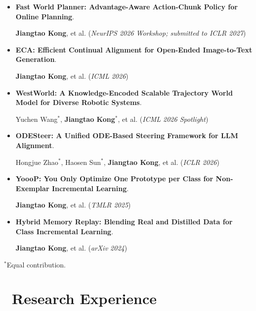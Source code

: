 \documentclass{resume}
\newcommand{\publicationdetails}[1]{%
  {\fontsize{9.5}{11}\selectfont\color{black!72}#1\par}%
}
\begin{document}
\begin{itemize}[itemsep=2pt, parsep=0pt]
  \small
  \item \textbf{Fast World Planner: Advantage-Aware Action-Chunk Policy for Online Planning}.\\[0.5pt]
  \publicationdetails{
  \textbf{Jiangtao Kong}, et al.
  (\textit{NeurIPS 2026 Workshop; submitted to ICLR 2027})}

  \item \textbf{ECA: Efficient Continual Alignment for Open-Ended Image-to-Text Generation}.\\[0.5pt]
  \publicationdetails{
  \textbf{Jiangtao Kong}, et al.
  (\textit{ICML 2026})}

  \item \textbf{WestWorld: A Knowledge-Encoded Scalable Trajectory World Model for Diverse Robotic Systems}.\\[0.5pt]
  \publicationdetails{
  Yuchen Wang$^*$, \textbf{Jiangtao Kong}$^*$, et al.
  (\textit{ICML 2026 Spotlight})}

  \item \textbf{ODESteer: A Unified ODE-Based Steering Framework for LLM Alignment}.\\[0.5pt]
  \publicationdetails{
  Hongjue Zhao$^*$, Haosen Sun$^*$, \textbf{Jiangtao Kong}, et al.
  (\textit{ICLR 2026})}

  \item \textbf{YoooP: You Only Optimize One Prototype per Class for Non-Exemplar Incremental Learning}.\\[0.5pt]
  \publicationdetails{
  \textbf{Jiangtao Kong}, et al.
  (\textit{TMLR 2025})}

  \item \textbf{Hybrid Memory Replay: Blending Real and Distilled Data for Class Incremental Learning}.\\[0.5pt]
  \publicationdetails{
  \textbf{Jiangtao Kong}, et al.
  (\textit{arXiv 2024})}
\end{itemize}
\vspace{-0.5em}
{\small $^*$Equal contribution.}


\vspace{-0.25cm}
\section{\faUsers\ Research Experience}

\begingroup
{}
\titlespacing*{\subsection}{0pt}{1.6ex}{0.5ex}
\end{document}
